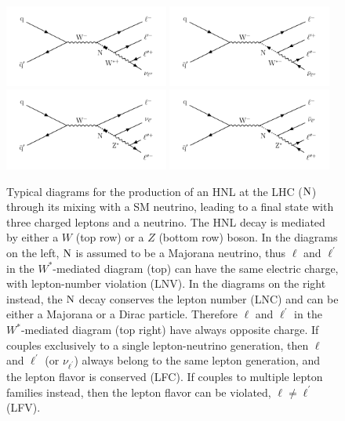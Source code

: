 \begin{figure}
\centering
\includegraphics[width=0.48\textwidth]{Figures/c3/hnl_feyn.pdf}
\includegraphics[width=0.48\textwidth]{Figures/c3/hnl_feyn_2.pdf}\\
\includegraphics[width=0.48\textwidth]{Figures/c3/hnl_z_feyn.pdf}
\includegraphics[width=0.48\textwidth]{Figures/c3/hnl_z_feyn_2.pdf}
\caption{Typical diagrams for the production of an HNL at the LHC 
($\mathrm{N}$) through its mixing with a SM neutrino, leading to a
final state with three charged leptons and a neutrino.
The HNL decay is mediated by either a $W$ (top row) or a $Z$ (bottom
row) boson.
In the diagrams on the left, $\mathrm{N}$ is assumed to be a Majorana
neutrino, thus $\ell$ and $\ell^\prime$ in the $W^\ast$-mediated
diagram (top) can have the same electric charge, with lepton-number
violation (LNV).
In the diagrams on the right instead, the $\mathrm{N}$ decay conserves the
lepton number (LNC) and can be either a Majorana or a Dirac
particle. Therefore $\ell$ and $\ell^\prime$ in the
$W^\ast$-mediated diagram (top right) have always opposite charge.
If \hnl couples exclusively to a single lepton-neutrino generation,
then $\ell$ and $\ell^\prime$ (or $\nu_{\ell^{\prime}}$) always belong
to the same lepton generation, and the lepton flavor is conserved
(LFC). If \hnl couples to multiple lepton families instead, then the
lepton flavor can be violated, $\ell\neq\ell^\prime$ (LFV).}
\label{fig:c3hnldiagram}
\end{figure}


